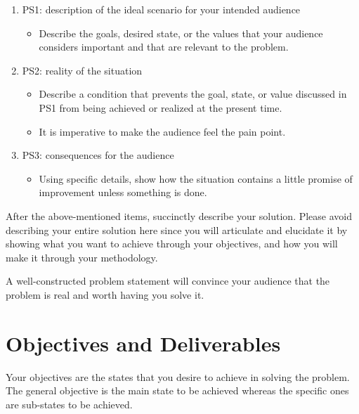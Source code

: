 \begin{enumerate}
	\item PS1: description of the ideal scenario for your intended audience	
	\begin{itemize}
		\item Describe the goals, desired state, or the values that your audience considers important and that are relevant to the problem.
	\end{itemize}
	
	\item PS2:  reality of the situation
	\begin{itemize}
			\item Describe a condition that prevents the goal, state, or value discussed in PS1 from being achieved or realized at the present time.
			\item It is imperative to make the audience feel the pain point.
	\end{itemize}
	
	\item PS3:  consequences for the audience		
	\begin{itemize}
			\item Using specific details, show how the situation contains a little promise of improvement unless something is done.
	\end{itemize}

\end{enumerate}

\noindent After the above-mentioned items, succinctly describe your solution.  Please avoid describing your entire solution here since you will articulate and elucidate it by showing what you want to achieve through your objectives, and how you will make it through your methodology.

\noindent A well-constructed problem statement will convince your audience that the problem is real and worth having you solve it.



\graytx{\blindtext}



\section{Objectives and Deliverables}

Your objectives are the states that you desire to achieve in solving the problem. The general objective is the main state to be achieved whereas the specific ones are sub-states to be achieved.

